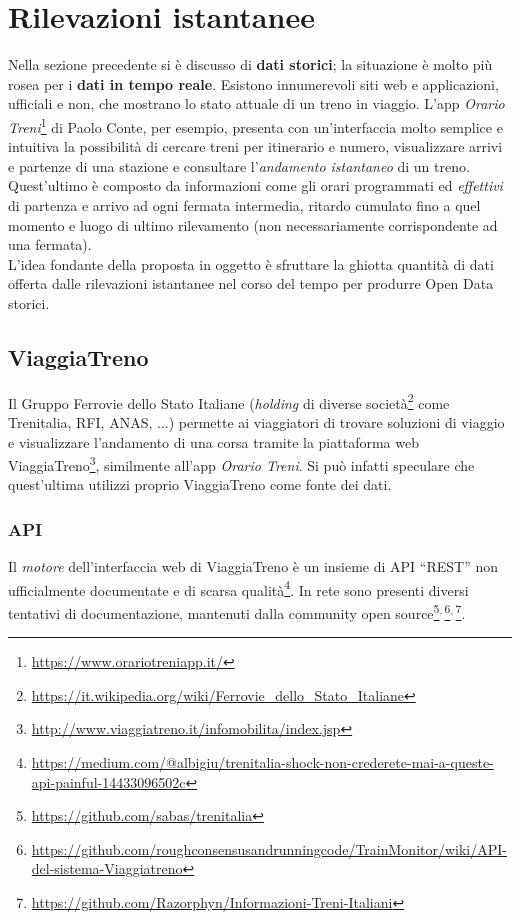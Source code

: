 \documentclass[italian,11pt,a4paper,final]{article}
\newcommand{\hochkomma}{$^{,\,}$}
\begin{document}
	\section{Rilevazioni istantanee}
	Nella sezione precedente si è discusso di \textbf{dati storici}; la situazione è molto più rosea per i \textbf{dati in tempo reale}.
	Esistono innumerevoli siti web e applicazioni, ufficiali e non, che mostrano lo stato attuale di un treno in viaggio. 
	L'app \textit{Orario Treni}\footnote{\url{https://www.orariotreniapp.it/}} di Paolo Conte, per esempio, presenta con un'interfaccia molto semplice e intuitiva la possibilità di cercare treni per itinerario e numero, visualizzare arrivi e partenze di una stazione e consultare l'\textit{andamento istantaneo} di un treno.
	Quest'ultimo è composto da informazioni come gli orari programmati ed \textit{effettivi} di partenza e arrivo ad ogni fermata intermedia, ritardo cumulato fino a quel momento e luogo di ultimo rilevamento (non necessariamente corrispondente ad una fermata). \\
	
	L'idea fondante della proposta in oggetto è sfruttare la ghiotta quantità di dati offerta dalle rilevazioni istantanee nel corso del tempo per produrre Open Data storici.
	
	\subsection{ViaggiaTreno}
	Il Gruppo Ferrovie dello Stato Italiane (\textit{holding} di diverse società\footnote{\url{https://it.wikipedia.org/wiki/Ferrovie_dello_Stato_Italiane}} come Trenitalia, RFI, ANAS, ...) permette ai viaggiatori di trovare soluzioni di viaggio e visualizzare l'andamento di una corsa tramite la piattaforma web ViaggiaTreno\footnote{\url{http://www.viaggiatreno.it/infomobilita/index.jsp}}, similmente all'app \textit{Orario Treni}.
	Si può infatti speculare che quest'ultima utilizzi proprio ViaggiaTreno come fonte dei dati.
	
	\subsubsection{API}
	Il \textit{motore} dell'interfaccia web di ViaggiaTreno è un insieme di API ``REST'' non ufficialmente documentate e di scarsa qualità\footnote{\url{https://medium.com/@albigiu/trenitalia-shock-non-crederete-mai-a-queste-api-painful-14433096502c}}.
	In rete sono presenti diversi tentativi di documentazione, mantenuti dalla community open source\footnote{\url{https://github.com/sabas/trenitalia}}\hochkomma\footnote{\url{https://github.com/roughconsensusandrunningcode/TrainMonitor/wiki/API-del-sistema-Viaggiatreno}}\hochkomma\footnote{\url{https://github.com/Razorphyn/Informazioni-Treni-Italiani}}.
	
\end{document}

